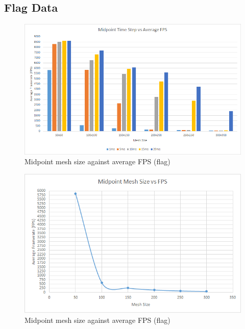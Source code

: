 \begin{landscape}
\subsection{Flag Data}

    \begin{figure}[!htb]
    \begin{center}
      \includegraphics[scale=0.95]{Figures/flag_m_fps}
    \end{center}
    \caption{Midpoint mesh size against average FPS (flag)}
    \label{fig:m fps flag}
  \end{figure}
\end{landscape}
  
    \begin{figure}
    \begin{center}
      \includegraphics[scale=.9]{Figures/flag_m_m_fps}
    \end{center}
    \caption{Midpoint mesh size against average FPS (flag)}
    \label{fig:m mesh fps flag}
  \end{figure}
  
